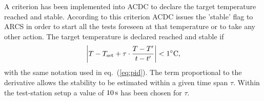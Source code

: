A criterion has been implemented into ACDC to declare the target temperature reached and stable. According to this criterion ACDC issues the 'stable' flag to ARCS in order to start all the tests foreseen at that temperature or to take any other action. The target temperature is declared reached and stable if
\begin{equation}
\left| T-T_{\rm set} + \tau\cdot\frac{T-T'}{t-t'}\right| < 1^{\circ}{\rm C},
\end{equation}
with the same notation used in eq.~(\ref{eq:pid}). The term proportional to the derivative allows the stability to be estimated within a given time span $\tau$. Within the test-station setup a value of $10\rm \, s$ has been chosen for $\tau$.  

